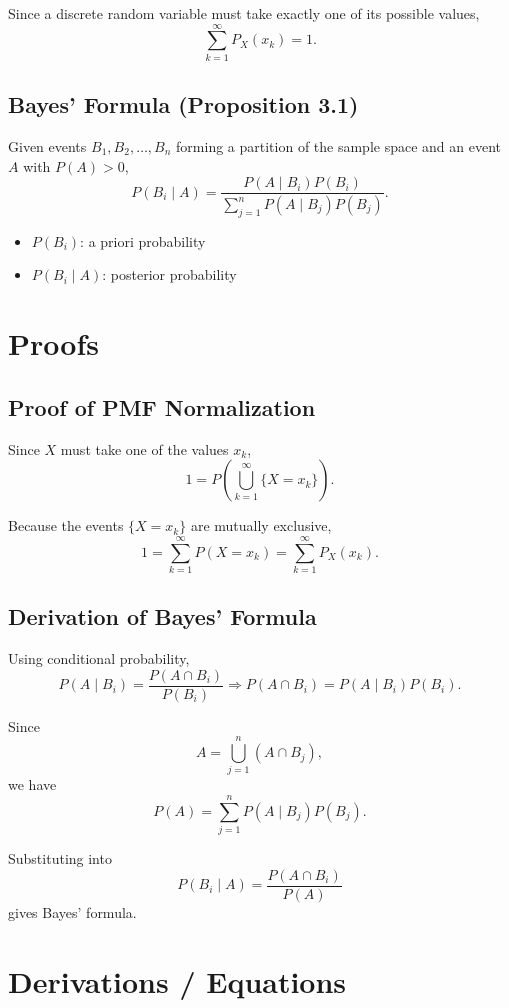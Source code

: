 \documentclass[12pt]{article}
\begin{document}
Since a discrete random variable must take exactly one of its possible values,
\[
\sum_{k=1}^{\infty} P_X(x_k) = 1.
\]

\subsection*{Bayes' Formula (Proposition 3.1)}

Given events $B_1, B_2, \dots, B_n$ forming a partition of the sample space and an event $A$ with $P(A) > 0$,
\[
P(B_i \mid A) =
\frac{P(A \mid B_i)P(B_i)}
{\sum_{j=1}^{n} P(A \mid B_j)P(B_j)}.
\]

\begin{itemize}
    \item $P(B_i)$: a priori probability
    \item $P(B_i \mid A)$: posterior probability
\end{itemize}

\section*{Proofs}

\subsection*{Proof of PMF Normalization}

Since $X$ must take one of the values $x_k$,
\[
1 = P\left(\bigcup_{k=1}^{\infty} \{X = x_k\}\right).
\]

Because the events $\{X = x_k\}$ are mutually exclusive,
\[
1 = \sum_{k=1}^{\infty} P(X = x_k) = \sum_{k=1}^{\infty} P_X(x_k).
\]

\subsection*{Derivation of Bayes' Formula}

Using conditional probability,
\[
P(A \mid B_i) = \frac{P(A \cap B_i)}{P(B_i)}
\Rightarrow
P(A \cap B_i) = P(A \mid B_i)P(B_i).
\]

Since
\[
A = \bigcup_{j=1}^{n} (A \cap B_j),
\]
we have
\[
P(A) = \sum_{j=1}^{n} P(A \mid B_j)P(B_j).
\]

Substituting into
\[
P(B_i \mid A) = \frac{P(A \cap B_i)}{P(A)}
\]
gives Bayes' formula.

\section*{Derivations / Equations}
\end{document}
